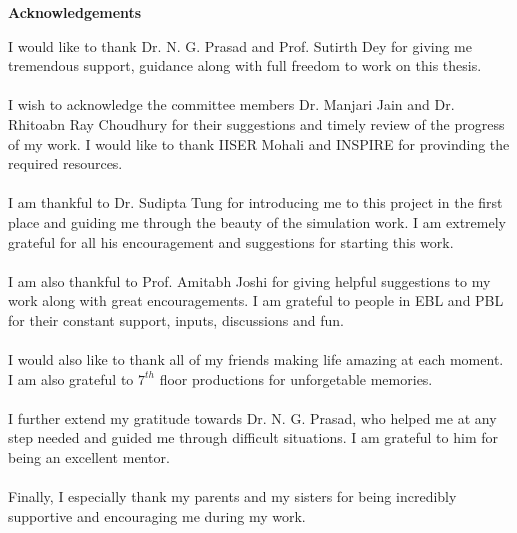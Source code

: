 \begin{center}
\Large  {\bf Acknowledgements }
\end{center}
I would like to thank Dr. N. G. Prasad and Prof. Sutirth Dey for giving me tremendous support, guidance along with full freedom to work on this thesis. \\\\
I wish to acknowledge the committee members Dr. Manjari Jain and Dr. Rhitoabn Ray Choudhury for their suggestions and timely review of the progress of my work. I would like to thank IISER Mohali and INSPIRE for provinding the required resources.\\\\
I am thankful to Dr. Sudipta Tung for introducing me to this project in the first place and guiding me through the beauty of the simulation work. I am extremely grateful for all his encouragement and suggestions for starting this work.\\\\
I am also thankful to Prof. Amitabh Joshi for giving helpful suggestions to my work along with great encouragements. I am grateful to people in EBL and PBL for their constant support, inputs, discussions and fun.\\\\
I would also like to thank all of my friends making life amazing at each moment. I am also grateful to $7^{th}$ floor productions for unforgetable memories.\\\\
I further extend my gratitude towards Dr. N. G. Prasad, who helped me at any step needed and guided me through difficult situations. I am grateful to him for being an excellent mentor.\\\\
Finally, I especially thank my parents and my sisters for being incredibly supportive and encouraging me during my work.
\vfill
\cleardoublepage
